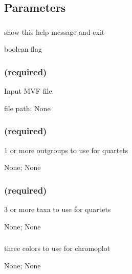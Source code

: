 \documentclass[letterpaper,11pt,english]{sphinxmanual}
\begin{document}
\subsection{Parameters}
\label{\detokenize{prog_desc:id124}}

\subsubsection{}
\label{\detokenize{prog_desc:id125}}
 show this help message and exit

 boolean flag


\subsubsection{ (required)}
\label{\detokenize{prog_desc:id126}}
 Input MVF file.

 file path;  None


\subsubsection{ (required)}
\label{\detokenize{prog_desc:outgroup-required}}
 1 or more outgroups to use for quartets

 None;  None


\subsubsection{ (required)}
\label{\detokenize{prog_desc:samples-required}}
 3 or more taxa to use for quartets

 None;  None


\subsubsection{}
\label{\detokenize{prog_desc:colors}}
 three colors to use for chromoplot

 None;  None
\end{document}
